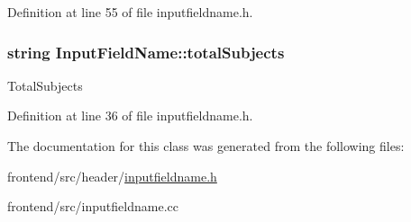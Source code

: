 Definition at line 55 of file inputfieldname.\-h.

\hypertarget{classInputFieldName_ac58130077f39d82aaf447b1a67e9f70f}{
\subsubsection[{total\-Subjects}]{\setlength{\rightskip}{0pt plus 5cm}string Input\-Field\-Name\-::total\-Subjects}}\label{classInputFieldName_ac58130077f39d82aaf447b1a67e9f70f}
Total\-Subjects 

Definition at line 36 of file inputfieldname.\-h.



The documentation for this class was generated from the following files\-:\begin{DoxyCompactItemize}
\item 
frontend/src/header/\hyperlink{inputfieldname_8h}{inputfieldname.\-h}\item 
frontend/src/inputfieldname.\-cc\end{DoxyCompactItemize}
